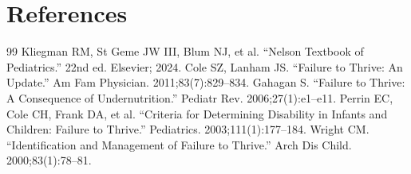 \section*{References}
\begin{thebibliography}{99}
 Kliegman RM, St Geme JW III, Blum NJ, et al. ``Nelson Textbook of Pediatrics.'' 22nd ed. Elsevier; 2024.
 Cole SZ, Lanham JS. ``Failure to Thrive: An Update.'' Am Fam Physician. 2011;83(7):829--834.
 Gahagan S. ``Failure to Thrive: A Consequence of Undernutrition.'' Pediatr Rev. 2006;27(1):e1--e11.
 Perrin EC, Cole CH, Frank DA, et al. ``Criteria for Determining Disability in Infants and Children: Failure to Thrive.'' Pediatrics. 2003;111(1):177--184.
 Wright CM. ``Identification and Management of Failure to Thrive.'' Arch Dis Child. 2000;83(1):78--81.
\end{thebibliography}
